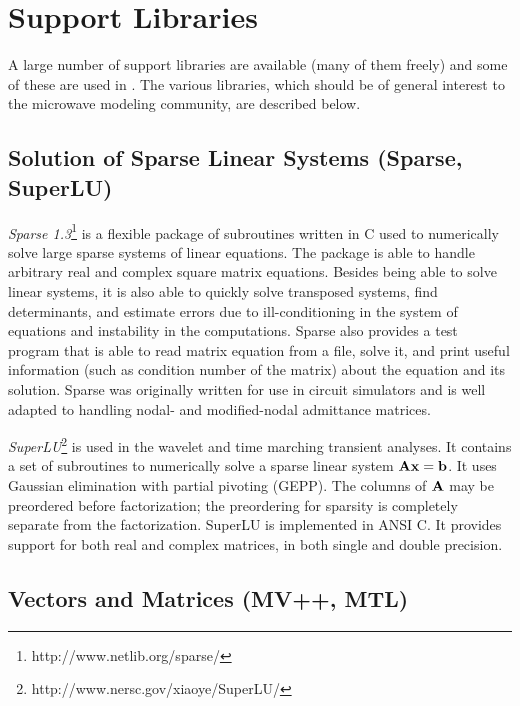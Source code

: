 
\chapter{Support Libraries} \label{support:oo}

A large number of support libraries are available (many of them
freely) and some of these are used in \FDA . The various
libraries, which should be of general interest to the microwave
modeling community, are described below.

\section{Solution of Sparse Linear Systems (Sparse, SuperLU)}

\emph{Sparse 1.3}\footnote{http://www.netlib.org/sparse/}
\cite{Sparse} is a flexible package of subroutines written in C
used to numerically solve large sparse systems of linear
equations.  The package is able to handle arbitrary real and
complex square matrix equations.  Besides being able to solve
linear systems, it is also able to quickly solve transposed
systems, find determinants, and estimate errors due to
ill-conditioning in the system of equations and instability in the
computations.  Sparse also provides a test program that is able to
read matrix equation from a file, solve it, and print useful
information (such as condition number of the matrix) about the
equation and its solution. Sparse was originally written for use
in circuit simulators and is well adapted to handling nodal- and
modified-nodal admittance matrices.

\emph{SuperLU}\footnote{http://www.nersc.gov/xiaoye/SuperLU/} is
used in the wavelet and time marching transient analyses. It
contains a set of subroutines to numerically solve a sparse linear
system ${\bf A} {\bf x} = {\bf b}$. It uses Gaussian elimination
with partial pivoting (GEPP).  The columns of ${\bf A}$ may be
preordered before factorization; the preordering for sparsity is
completely separate from the factorization. SuperLU is implemented
in ANSI C. It provides support for both real and complex matrices,
in both single and double precision.

\section{Vectors and Matrices (MV++, MTL)}


